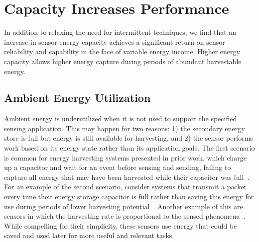 
\section{Capacity Increases Performance}
\label{sec:store}

In addition to relaxing the need for intermittent techniques, we find that
an increase in sensor energy capacity
achieves a significant return on sensor
reliability and capability in the face of variable energy income.  Higher
energy capacity allows higher energy capture during periods of abundant
harvestable energy.


\subsection{Ambient Energy Utilization}
\label{sec:store:utilization}

Ambient energy is underutilized when it is not used to support the specified
sensing application. This may happen for two reasons: 1) the secondary
energy store is full but energy is still available for harvesting, and 2) the
sensor performs work based on its energy state rather than its application
goals. The first scenario is common for energy harvesting systems
presented in prior work, which charge up a capacitor and wait for an event
before sensing and sending, failing to capture all energy that may
have been harvested while their capacitor was full~\cite{campbellEnergy14}.
For an example of the second scenario, consider
systems that transmit a packet every time their energy storage capacitor
is full rather than saving this energy for use during periods of lower harvesting
potential~\cite{hesterFlicker17, colinReconfigurable18}. Another example of this are sensors in which the harvesting
rate is proportional to the sensed phenomena~\cite{debruin2013monjolo}.
While compelling for their simplicity, these sensors use
energy that could be saved and used
later for more useful and relevant tasks.

